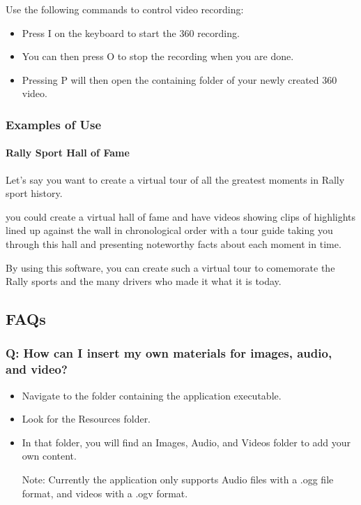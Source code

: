 			Use the following commands to control video recording:
			
			\begin{itemize}
				
				\item Press I on the keyboard to start the 360 recording.  
				
				\item You can then press O to stop the recording when you are done.  
				
				\item Pressing P will then open the containing folder of your newly created 360 video.  
				
			\end{itemize}
			
			
		\subsubsection{Examples of Use}
		
			\paragraph{Rally Sport Hall of Fame}
				
				Let's say you want to create a virtual tour of all the greatest moments in Rally sport history.  
				
				you could create a virtual hall of fame and have videos showing clips of highlights lined up against the wall in chronological order with a tour guide taking you through this hall and presenting noteworthy facts about each moment in time.  
				
				By using this software, you can create such a virtual tour to comemorate the Rally sports and the many drivers who made it what it is today.  
				
			
	
	
	\subsection{FAQs}
	
		\subsubsection{Q: How can I insert my own materials for images, audio, and video?}
			
			\begin{itemize}
				
				\item Navigate to the folder containing the application executable.  
				
				\item Look for the Resources folder.  
				
				\item In that folder, you will find an Images, Audio, and Videos folder to add your own content.  
				
				Note: Currently the application only supports Audio files with a .ogg file format, and videos with a .ogv format.  
				
			\end{itemize}
		